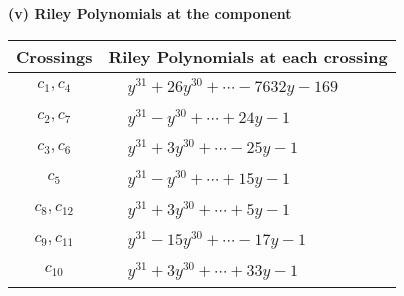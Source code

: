 \documentclass[1p]{elsarticle_modified}
\theoremstyle{definition}
\begin{document}
\newpage\renewcommand{\arraystretch}{1}
\flushleft \textbf{(v) Riley Polynomials at the component}\newline \\
\begin{tabular}{m{50pt}|m{274pt}}
Crossings & \hspace{64pt}Riley Polynomials at each crossing \\
\hline $$\begin{aligned}c_{1},c_{4}\end{aligned}$$&$\begin{aligned}
&y^{31}+26 y^{30}+\cdots-7632 y-169
\end{aligned}$\\
\hline $$\begin{aligned}c_{2},c_{7}\end{aligned}$$&$\begin{aligned}
&y^{31}- y^{30}+\cdots+24 y-1
\end{aligned}$\\
\hline $$\begin{aligned}c_{3},c_{6}\end{aligned}$$&$\begin{aligned}
&y^{31}+3 y^{30}+\cdots-25 y-1
\end{aligned}$\\
\hline $$\begin{aligned}c_{5}\end{aligned}$$&$\begin{aligned}
&y^{31}- y^{30}+\cdots+15 y-1
\end{aligned}$\\
\hline $$\begin{aligned}c_{8},c_{12}\end{aligned}$$&$\begin{aligned}
&y^{31}+3 y^{30}+\cdots+5 y-1
\end{aligned}$\\
\hline $$\begin{aligned}c_{9},c_{11}\end{aligned}$$&$\begin{aligned}
&y^{31}-15 y^{30}+\cdots-17 y-1
\end{aligned}$\\
\hline $$\begin{aligned}c_{10}\end{aligned}$$&$\begin{aligned}
&y^{31}+3 y^{30}+\cdots+33 y-1
\end{aligned}$\\
\hline
\end{tabular}\\~\\
\end{document}
